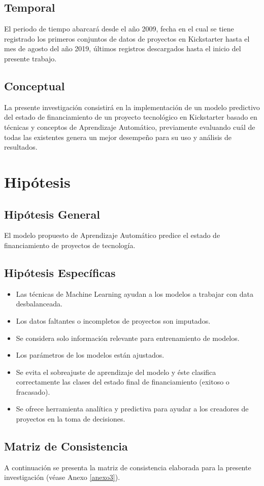 \subsection{Temporal}
El periodo de tiempo abarcará desde el año 2009, fecha en el cual se tiene registrado los primeros conjuntos de datos de proyectos en Kickstarter hasta el mes de agosto del año 2019, últimos registros descargados hasta el inicio del presente trabajo.

\subsection{Conceptual}
La presente investigación consistirá en la implementación de un modelo predictivo del estado de financiamiento de un proyecto tecnológico en Kickstarter basado en técnicas y conceptos de Aprendizaje Automático, previamente evaluando cuál de todas las existentes genera un mejor desempeño para su uso y análisis de resultados.

\section{Hipótesis}

\subsection{Hipótesis General}
\newcommand{\HipotesisGeneral}{
El modelo propuesto de Aprendizaje Automático predice el estado de financiamiento de proyectos de tecnología.
}
\HipotesisGeneral
\subsection{Hipótesis Específicas}
\newcommand{\Hone}{
Las técnicas de Machine Learning ayudan a los modelos a trabajar con data desbalanceada.
}
\newcommand{\Htwo}{
Los datos faltantes o incompletos de proyectos son imputados.
}
\newcommand{\Hthree}{
Se considera solo información relevante para entrenamiento de modelos.
}
\newcommand{\Hfour}{
Los parámetros de los modelos están ajustados.
}
\newcommand{\Hfive}{
Se evita el sobreajuste de aprendizaje del modelo y éste clasifica correctamente las clases del estado final de financiamiento (exitoso o fracasado).
}
\newcommand{\Hsix}{
Se ofrece herramienta analítica y predictiva para ayudar a los creadores de proyectos en la toma de decisiones.
}
\begin{itemize}
	\item \Hone
	\item \Htwo
	\item \Hthree
	\item \Hfour
	\item \Hfive
	\item \Hsix
\end{itemize}

\subsection{Matriz de Consistencia}
A continuación se presenta la matriz de consistencia elaborada para la presente investigación (véase Anexo \ref{anexo3}).

